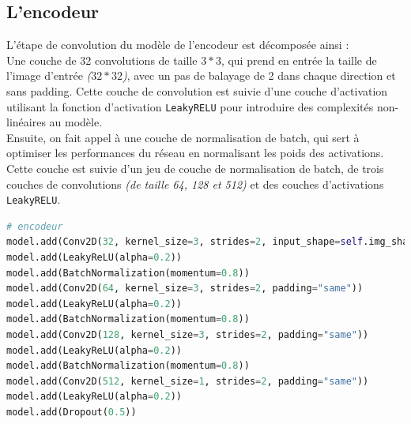 \documentclass[11pt,a4paper]{article}
\begin{document}
        \subsection{L'encodeur}
        
L'étape de convolution du modèle de l'encodeur est décomposée ainsi :\\
Une couche de 32 convolutions de taille $3*3$, qui prend en entrée la taille de l'image d'entrée \emph{($32*32$)}, avec un pas de balayage de 2 dans chaque direction et sans padding. Cette couche de convolution est suivie d'une couche d'activation utilisant la fonction d'activation \texttt{LeakyRELU} pour introduire des complexités non-linéaires au modèle.\\
Ensuite, on fait appel à une couche de normalisation de batch, qui sert à optimiser les performances du réseau en normalisant les poids des activations. Cette couche est suivie d'un jeu de couche de normalisation de batch, de trois couches de convolutions \emph{(de taille 64, 128 et 512)} et des couches d'activations \texttt{LeakyRELU}.               
            \begin{lstlisting}[language=Python, caption=Code Python de l'encodeur]
# encodeur
model.add(Conv2D(32, kernel_size=3, strides=2, input_shape=self.img_shape, https://www.xm1math.net/doculatex/listes.htmlpadding="same"))
model.add(LeakyReLU(alpha=0.2))
model.add(BatchNormalization(momentum=0.8))
model.add(Conv2D(64, kernel_size=3, strides=2, padding="same"))
model.add(LeakyReLU(alpha=0.2))
model.add(BatchNormalization(momentum=0.8))
model.add(Conv2D(128, kernel_size=3, strides=2, padding="same"))
model.add(LeakyReLU(alpha=0.2))
model.add(BatchNormalization(momentum=0.8))
model.add(Conv2D(512, kernel_size=1, strides=2, padding="same"))
model.add(LeakyReLU(alpha=0.2))
model.add(Dropout(0.5)) \end{lstlisting}
        
\end{document}
